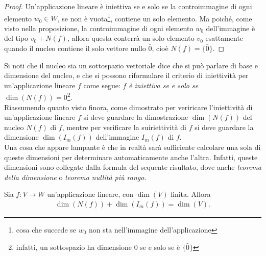 \begin{proof}
  Un'applicazione lineare è iniettiva se e solo se la controimmagine di ogni elemento $w_0\in W$, se
  non è vuota\footnote{cosa che succede se $w_0$ non sta nell'immagine dell'applicazione}, contiene
  un solo elemento. Ma poiché, come visto nella proposizione, la controimmagine di ogni elemento $w_0$
  dell'immagine è del tipo $v_0+N(f)$, allora questa conterrà un solo elemento $v_0$ esattamente quando
  il nucleo contiene il solo vettore nullo $\bar{0}$, cioè $N(f)=\{\bar{0}\}$.
\end{proof}
Si noti che il nucleo sia un sottospazio vettoriale dice che si può parlare di base e dimensione del
nucleo, e che si possono riformulare il criterio di iniettività per un'applicazione lineare $f$ come
segue: $f$ \emph{è iniettiva se e solo se} $\dim(N(f))=0$\footnote{infatti, un sottospazio ha dimensione
  0 se e solo se è $\{\bar{0}\}$}.\\
Riassumendo quanto visto finora, come dimostrato per veriricare l'iniettività di un'applicazione
lineare $f$ si deve guardare la dimostrazione $\dim(N(f))$ del nucleo $N(f)$ di $f$, mentre per
verificare la suiriettività di $f$ si deve guardare la dimensione $\dim(I_m(f))$ dell'immagine
$I_m(f)$ di $f$.\\
Una cosa che appare lampante è che in realtà sarà sufficiente calcolare una sola di queste dimensioni
per determinare automaticamente anche l'altra. Infatti, queste dimensioni sono collegate dalla formula
del sequente risultato, dove anche \emph{teorema della dimensione} o \emph{teorema nullità più rango}.
\begin{teo}
  \label{teo:iniediappllin1}
  Sia $f:V\to W$ un'applicazione lineare, con $\dim(V)$ finita. Allora
  \begin{eqnarray}
    \label{eq:iniediappllin1-1}
    \dim(N(f))+\dim(I_m(f))=\dim(V).
  \end{eqnarray}
\end{teo}
